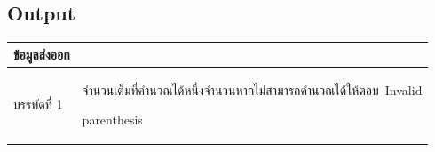 \documentclass{article}
\begin{document}
\subsection*{Output}
{\def\LTcaptype{none} %

\begin{longtable}[]{@{}

  >{\raggedright\arraybackslash}p{}

  >{\raggedright\arraybackslash}p{}@{}}

\toprule\noalign{}

\begin{minipage}[b]{\linewidth}\raggedright

ข้อมูลส่งออก

\end{minipage} & \begin{minipage}[b]{\linewidth}\raggedright

\hfill\break

\strut

\end{minipage} \\

\midrule\noalign{}

\endhead

\bottomrule\noalign{}

\endlastfoot

บรรทัดที่ 1 & จำนวนเต็มที่คำนวณได้หนึ่งจำนวนหากไม่สามารถคำนวณได้ให้ตอบ~Invalid

parenthesis \\

\end{longtable}

}
\end{document}
